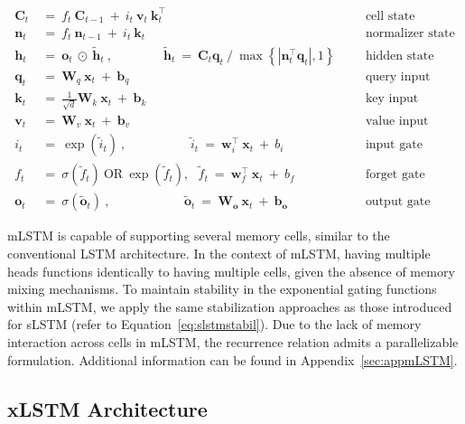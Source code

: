\begin{align}
\label{eq:mlstm_recurrent_begin}
\mathbf{C}_t \ &= \  f_t \ \mathbf{C}_{t-1} \ + \ 
  i_t \ \mathbf{v}_t \ \mathbf{k}_t^\top & &  &\text{cell state} \\
\mathbf{n}_t \ &= \  f_t \ \mathbf{n}_{t-1} \ + \ 
  i_t \ \mathbf{k}_t & &  &\text{normalizer state} \\
\mathbf{h}_t  \ &= \ \mathbf{o}_t \ \odot \ \tilde{\mathbf{h}}_t
\ , \qquad \qquad 
\tilde{\mathbf{h}}_t \ = \   \mathbf{C}_t \mathbf{q}_t \ / \ 
  \max \left\{ |\mathbf{n}_t^\top \mathbf{q}_t|, 1 \right\} 
   &&&\text{hidden state} \\
\mathbf{q}_t \ &= \ \mathbf{W}_q \ \mathbf{x}_t \ + \ \mathbf{b}_q  & &  &\text{query input} \\
\mathbf{k}_t \ &= \ \frac{1}{\sqrt{d}} \mathbf{W}_k \ \mathbf{x}_t \ + \ \mathbf{b}_k  & &  &\text{key input} \\
\mathbf{v}_t \ &= \ \mathbf{W}_v \ \mathbf{x}_t \ + \ \mathbf{b}_v  & &  &\text{value input} \\
i_t \ &= \ \!\exp \!  \! \left( \tilde{i}_t  \right) \ , 
 \qquad \qquad \ \ \ \ \,
  \tilde{i}_t \ = \ \mathbf{w}^\top_{i} \ \mathbf{x}_t \ + \  b_{i} \ \ \ 
  &&&\text{input gate} \\
f_t \ &= \ \sigma \!  \left(  \tilde{f}_t \right) \ \text{OR} \ \!\exp \!  \! \left(  \tilde{f}_t \right) , \ \ \: \!
\tilde{f}_t \ = \ \mathbf{w}^\top_{f} \ \mathbf{x}_t  \ + \
  b_{f}
  &&& \text{forget gate} \\
\label{eq:mlstm_recurrent_end}
\mathbf{o}_t \ &= \ \sigma \left( \tilde{\mathbf{o}}_t \right) \ , \qquad \qquad \quad \ \ \ \,
  \tilde{\mathbf{o}}_t  \ = \ \mathbf{W}_{\mathbf{o}} \ \mathbf{x}_t \ + \
  \mathbf{b}_{\mathbf{o}}
  &&&\text{output gate} 
\end{align}

mLSTM is capable of supporting several memory cells, similar to the conventional LSTM architecture. In the context of mLSTM, having multiple heads functions identically to having multiple cells, given the absence of memory mixing mechanisms. To maintain stability in the exponential gating functions within mLSTM, we apply the same stabilization approaches as those introduced for sLSTM (refer to Equation~\ref{eq:slstmstabil}). Due to the lack of memory interaction across cells in mLSTM, the recurrence relation admits a parallelizable formulation. Additional information can be found in Appendix~\ref{sec:appmLSTM}.

\subsection{xLSTM Architecture}
\label{sec:xLSTMarch}

